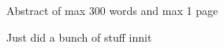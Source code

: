 

\begin{thesisabstract}
\begin{singlespace}

Abstract of max 300 words and max 1 page

Just did a bunch of stuff innit

\end{singlespace}
\end{thesisabstract}
